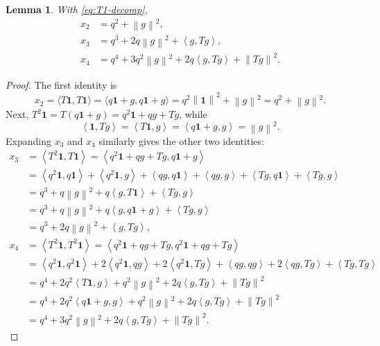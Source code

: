 ﻿\documentclass[11pt]{article}
\newtheorem{lemma}[theorem]{Lemma}
\numberwithin{equation}{section}
\newcommand{\one}{\mathbf 1}
\newcommand{\ip}[2]{\left\langle #1,#2\right\rangle}
\newcommand{\norm}[1]{\left\lVert #1\right\rVert}
\begin{document}
\begin{lemma}\label{lem:path-to-4}
  With \eqref{eq:T1-decomp},
  \begin{align*}
    x_2&=q^2+\norm g^2,\\
    x_3&=q^3+2q\norm g^2+\ip g{Tg},\\
    x_4&=q^4+3q^2\norm g^2+2q\ip g{Tg}+\norm{Tg}^2.
  \end{align*}
\end{lemma}

\begin{proof}
  The first identity is
  \[
    x_2 = \langle T\one, T\one\rangle = \langle q\one + g, q\one + g\rangle = q^2 \norm{\one}^2 + \norm{g}^2 = q^2 + \norm{g}^2.
  \]
  Next, $T^2\one=T(q \one + g) = q^2\one + qg + Tg$, while
  \[
    \ip{\one}{Tg}=\ip{T\one}{g}= \ip{q\one + g}{g}=\norm g^2.
  \]
  Expanding $x_3$ and $x_4$ similarly gives the other two identities:
  \begin{align*}
    x_3 &= \ip{T^2\one}{T\one} = \ip{q^2\one + qg + Tg}{q\one + g} \\
    {} &= \ip{q^2\one}{q\one} + \ip{q^2\one}{g} + \ip{qg}{q\one} + \ip{qg}{g} + \ip{Tg}{q\one} + \ip{Tg}{g} \\
    {} &= q^3 + q \norm{g}^2 + q \ip{g}{T \one} + \ip{Tg}{g} \\
    {} &= q^3 + q \norm{g}^2 + q \ip{g}{q \one + g} + \ip{Tg}{g} \\
    {} &= q^3 + 2q \norm{g}^2 + \ip{g}{Tg},
    \\
    x_4 &= \ip{T^2 \one}{T^2 \one} = \ip{q^2\one + qg + Tg}{q^2\one + qg + Tg} \\
    {} &= \ip{q^2\one}{q^2\one} + 2 \ip{q^2\one}{qg} + 2 \ip{q^2\one}{Tg} + \ip{qg}{qg} + 2 \ip{qg}{Tg} + \ip{Tg}{Tg} \\
    {} &= q^4 + 2q^2 \ip{T \one}{g} + q^2 \norm{g}^2 + 2q \ip{g}{Tg} + \norm{Tg}^2 \\
    {} &= q^4 + 2q^2 \ip{q \one + g}{g} + q^2 \norm{g}^2 + 2q \ip{g}{Tg} + \norm{Tg}^2 \\
    {} &= q^4 + 3q^2 \norm{g}^2 + 2q \ip{g}{Tg} + \norm{Tg}^2.
  \end{align*}
\end{proof}
\end{document}
